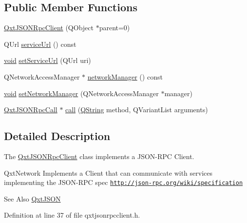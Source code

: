 \subsection*{Public Member Functions}
\begin{DoxyCompactItemize}
\item 
\hyperlink{class_qxt_j_s_o_n_rpc_client_a5d9a4fd5c248df626615e2d68b5eed80}{Qxt\-J\-S\-O\-N\-Rpc\-Client} (Q\-Object $\ast$parent=0)
\item 
Q\-Url \hyperlink{class_qxt_j_s_o_n_rpc_client_a9474ba5662df7fa775d982f3cc16ef80}{service\-Url} () const 
\item 
\hyperlink{group___u_a_v_objects_plugin_ga444cf2ff3f0ecbe028adce838d373f5c}{void} \hyperlink{class_qxt_j_s_o_n_rpc_client_a47ab3134426533c16cedd203d33c3934}{set\-Service\-Url} (Q\-Url uri)
\item 
Q\-Network\-Access\-Manager $\ast$ \hyperlink{class_qxt_j_s_o_n_rpc_client_a1a801438f9723a7996c9e0904f94196a}{network\-Manager} () const 
\item 
\hyperlink{group___u_a_v_objects_plugin_ga444cf2ff3f0ecbe028adce838d373f5c}{void} \hyperlink{class_qxt_j_s_o_n_rpc_client_a0537c80e6d94eee1a2a974b5c8a3c57f}{set\-Network\-Manager} (Q\-Network\-Access\-Manager $\ast$manager)
\item 
\hyperlink{class_qxt_j_s_o_n_rpc_call}{Qxt\-J\-S\-O\-N\-Rpc\-Call} $\ast$ \hyperlink{class_qxt_j_s_o_n_rpc_client_a2927df0db802be834abc854344873cd2}{call} (\hyperlink{group___u_a_v_objects_plugin_gab9d252f49c333c94a72f97ce3105a32d}{Q\-String} method, Q\-Variant\-List arguments)
\end{DoxyCompactItemize}


\subsection{Detailed Description}
The \hyperlink{class_qxt_j_s_o_n_rpc_client}{Qxt\-J\-S\-O\-N\-Rpc\-Client} class implements a J\-S\-O\-N-\/\-R\-P\-C Client. 

Qxt\-Network Implements a Client that can communicate with services implementing the J\-S\-O\-N-\/\-R\-P\-C spec \href{http://json-rpc.org/wiki/specification}{\tt http\-://json-\/rpc.\-org/wiki/specification}

\begin{DoxySeeAlso}{See Also}
\hyperlink{class_qxt_j_s_o_n}{Qxt\-J\-S\-O\-N} 
\end{DoxySeeAlso}


Definition at line 37 of file qxtjsonrpcclient.\-h.



